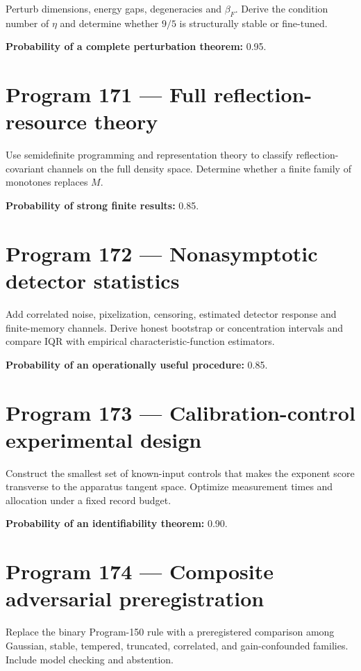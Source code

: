 \documentclass[11pt,a4paper,openany]{report}
\begin{document}
Perturb dimensions, energy gaps, degeneracies and \(\beta_F\). Derive the condition number of \(\eta\) and determine whether \(9/5\) is structurally stable or fine-tuned.

\textbf{Probability of a complete perturbation theorem:} 0.95.

\section{Program 171 --- Full reflection-resource theory}

Use semidefinite programming and representation theory to classify reflection-covariant channels on the full density space. Determine whether a finite family of monotones replaces \(M\).

\textbf{Probability of strong finite results:} 0.85.

\section{Program 172 --- Nonasymptotic detector statistics}

Add correlated noise, pixelization, censoring, estimated detector response and finite-memory channels. Derive honest bootstrap or concentration intervals and compare IQR with empirical characteristic-function estimators.

\textbf{Probability of an operationally useful procedure:} 0.85.

\section{Program 173 --- Calibration-control experimental design}

Construct the smallest set of known-input controls that makes the exponent score transverse to the apparatus tangent space. Optimize measurement times and allocation under a fixed record budget.

\textbf{Probability of an identifiability theorem:} 0.90.

\section{Program 174 --- Composite adversarial preregistration}

Replace the binary Program-150 rule with a preregistered comparison among Gaussian, stable, tempered, truncated, correlated, and gain-confounded families. Include model checking and abstention.
\end{document}
